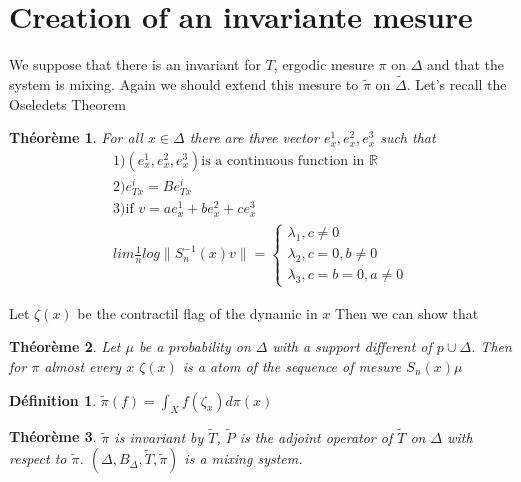 \documentclass[12pt]{article}
\theoremstyle{plain}%
\newtheorem{thm}{Théorème}[section]
\theoremstyle{definition}
\newtheorem{dfnt}{Définition}[section]
\theoremstyle{remark}
\begin{document}
\section{Creation of an invariante mesure}
We suppose that there is an invariant for $T$, ergodic mesure $\pi$ on $\Delta$ and that the system is mixing. Again we should extend this mesure to $\tilde{\pi}$ on $\tilde{\Delta}$.\newline
Let's recall the Oseledets Theorem
\begin{thm}
For all $x\in \Delta$ there are three vector $e^1_x,e^2_x,e^3_x$ such that \[
\begin{matrix}
1)(e^1_x,e^2_x,e^3_x)\text{is a continuous function in } \mathbb{R} \\
2)e^i_{Tx}=Be^i_{Tx} \\
3)\text{if }v=ae^1_x+be^2_x+ce^3_x\\
lim \frac{1}{n}log \|S_n^{-1}(x)v\|=
\left \{ \begin{matrix}
\lambda_1,c \ne 0\\
\lambda_2,c=0,b \ne 0 \\
\lambda_3,c=b=0,a\ne 0
\end{matrix}
\right .
\end{matrix}
\]
\end{thm}
Let $\zeta(x)$ be the contractil flag of the dynamic in $x$\newline
Then we can show that
\begin{thm}
Let $\mu$ be a probability on $\Delta$ with a support different of $p \cup \Delta$. Then for $\pi$ almost every $x$ $\zeta(x)$ is a atom of the sequence of mesure $S_n(x)\mu$
\end{thm}
\begin{dfnt}
$\tilde{\pi}(f)=\int_X f(\zeta_x) d \pi(x)$
\end{dfnt}
\begin{thm} %
$\tilde{\pi}$ is invariant by $\tilde{T}$, $\tilde{P}$ is the adjoint operator of $\tilde{T}$ on $\Delta$ with respect to $\tilde{\pi}$. $(\Delta,B_\Delta,\tilde{T},\tilde{\pi})$ is a mixing system.
\end{thm}
\end{document}

